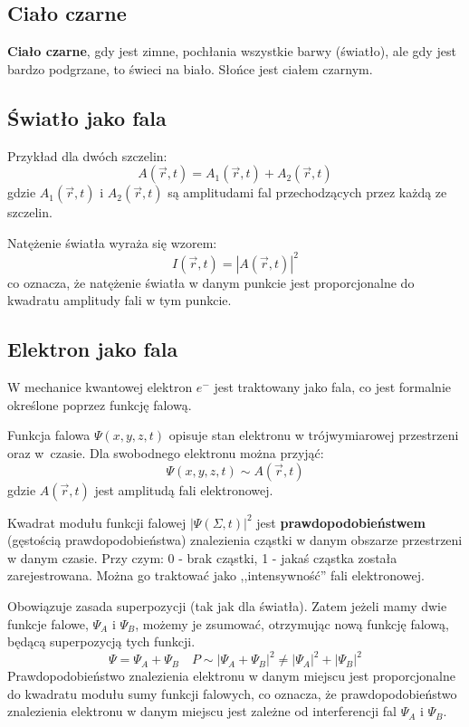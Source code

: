 \subsection{Ciało czarne}

\textbf{Ciało czarne}, gdy jest zimne, pochłania wszystkie barwy (światło), ale gdy jest bardzo podgrzane, to świeci na biało.
Słońce jest ciałem czarnym.

\subsection{Światło jako fala}
Przykład dla dwóch szczelin:
\[
A(\vec{r}, t) = A_1(\vec{r}, t) + A_2(\vec{r}, t)
\]
gdzie $A_1(\vec{r}, t)$ i $A_2(\vec{r}, t)$ są amplitudami fal przechodzących przez każdą ze szczelin.

Natężenie światła wyraża się wzorem:
\[
I(\vec{r}, t) = |A(\vec{r}, t)|^2
\]
co oznacza, że natężenie światła w danym punkcie jest proporcjonalne do kwadratu amplitudy fali w tym punkcie.

\subsection{Elektron jako fala}
W mechanice kwantowej elektron $e^-$ jest traktowany jako fala, co jest formalnie określone poprzez funkcję falową. 

Funkcja falowa $\Psi(x,y,z,t)$ opisuje stan elektronu w trójwymiarowej przestrzeni oraz w~czasie. Dla swobodnego elektronu można przyjąć:
\[
\Psi(x,y,z,t) \sim A(\vec{r}, t)
\]
gdzie $A(\vec{r},t)$ jest amplitudą fali elektronowej.

Kwadrat modułu funkcji falowej $|\Psi(\Sigma, t)|^2$ jest \textbf{prawdopodobieństwem} (gęstością prawdopodobieństwa) znalezienia cząstki w danym obszarze przestrzeni w danym czasie.
Przy czym: 0 - brak cząstki, 1 - jakaś cząstka została zarejestrowana. Można go traktować jako ,,intensywność'' fali elektronowej.

Obowiązuje zasada superpozycji (tak jak dla światła).
Zatem jeżeli mamy dwie funkcje falowe, $\Psi_A$ i $\Psi_B$, możemy je zsumować, otrzymując nową funkcję falową, będącą superpozycją tych funkcji.
\[
\Psi = \Psi_A + \Psi_B \quad P \sim |\Psi_A + \Psi_B|^2 \neq |\Psi_A|^2 + |\Psi_B|^2
\]
Prawdopodobieństwo znalezienia elektronu w danym miejscu jest proporcjonalne do kwadratu modułu sumy funkcji falowych,
co oznacza, że prawdopodobieństwo znalezienia elektronu w danym miejscu jest zależne od interferencji fal $\Psi_A$ i $\Psi_B$.

